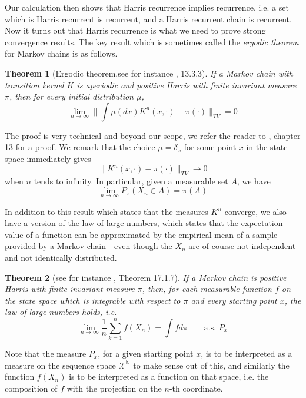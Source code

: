 \documentclass[a4paper, draft]{article}
\theoremstyle{own}
\newtheorem{thm}{Theorem}[section]
\theoremstyle{remark}
\newcommand{\N}{\mathbb{N}}
\begin{document}
Our calculation then shows that Harris recurrence implies recurrence, i.e. a set which is Harris recurrent is recurrent, and a Harris recurrent chain is recurrent. Now it turns out that Harris recurrence is what we need to prove strong convergence results. The key result which is sometimes called the {\em ergodic theorem} for Markov chains is as follows.

\begin{thm}[Ergodic theorem,see for instance \cite{MeynTweedie}, 13.3.3]
	If a Markov chain with transition kernel $K$ is aperiodic and positive Harris with finite invariant measure $\pi$, then for every 
	initial distribution $\mu$, 
	$$
	\lim_{n \rightarrow \infty} \| \int \mu(dx)K^n(x, \cdot) - \pi(\cdot) \|_{TV} = 0
	$$
\end{thm}


The proof is very technical and beyond our scope, we refer the reader to \cite{MeynTweedie}, chapter 13 for a proof. We remark that the choice $\mu = \delta_x$ for some point $x$ in the state
space immediately gives
$$
\| K^n(x,\cdot) - \pi(\cdot) \|_{TV} \rightarrow 0
$$
when $n$ tends to infinity. In particular, given a measurable set $A$, we have
$$
\lim_{n \rightarrow \infty} P_x(X_n \in A) = \pi(A)
$$

In addition to this result which states that the measures $K^n$ converge, we also have a version of the law of large numbers, which states that the expectation value of a function can be approximated by the empirical mean of a sample provided by a Markov chain - even though the $X_n$ are of course not independent and not identically distributed.

\begin{thm}[see for instance \cite{MeynTweedie}, Theorem 17.1.7]
	If a Markov chain is positive Harris with finite invariant measure $\pi$, then, for each measurable function $f$ on the state space which is integrable with respect to $\pi$ and every starting point $x$, the law of large numbers holds, i.e.
	$$
	\lim_{n \rightarrow \infty} \frac{1}{n} \sum_{k=1}^n f(X_n) = \int f d\pi 
	\qquad \text{a.s. } P_x 
	$$
\end{thm}

Note that the measure $P_x$, for a given starting point $x$, is to be interpreted as a measure on the sequence space ${\mathcal X}^\N$ to make sense out of this, and similarly the function $f(X_n)$ is to be interpreted as a function on that space, i.e. the composition of $f$ with the projection on the $n$-th coordinate.
\end{document}
